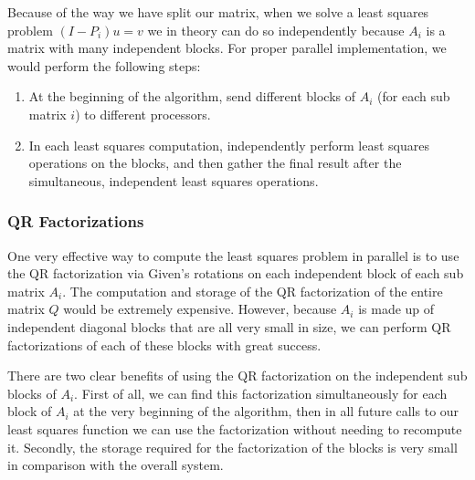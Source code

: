 \documentclass[a4paper,12pt]{article}
\begin{document}

Because of the way we have split our matrix, when we solve a least squares problem $(I-P_i)u = v$ we in theory can do so independently because $A_i$ is a matrix with many independent blocks. For proper parallel implementation, we would perform the following steps:

\begin{enumerate}
\item At the beginning of the algorithm, send different blocks of $A_i$ (for each sub matrix $i$) to different processors.
\item In each least squares computation, independently perform least squares operations on the blocks, and then gather the final result after the simultaneous, independent least squares operations.
\end{enumerate}

\subsubsection*{QR Factorizations}
One very effective way to compute the least squares problem in parallel is to use the QR factorization via Given's rotations on each independent block of each sub matrix $A_i$. The computation and storage of the QR factorization of the entire matrix $Q$ would be extremely expensive. However, because $A_i$ is made up of independent diagonal blocks that are all very small in size, we can perform QR factorizations of each of these blocks with great success.

There are two clear benefits of using the QR factorization on the independent sub blocks of $A_i$. First of all, we can find this factorization simultaneously for each block of $A_i$ at the very beginning of the algorithm, then in all future calls to our least squares function we can use the factorization without needing to recompute it. Secondly, the storage required for the factorization of the blocks is very small in comparison with the overall system.
\end{document}
